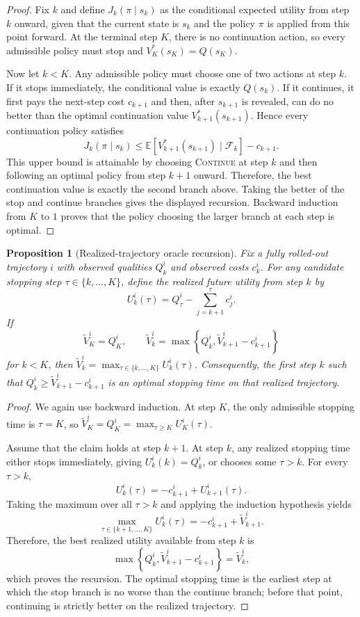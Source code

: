 \documentclass{article}
\newtheorem{proposition}{Proposition}[section]
\begin{document}
\begin{proof}
Fix $k$ and define $J_k(\pi\mid s_k)$ as the conditional expected utility from step $k$ onward, given that the current state is $s_k$ and the policy $\pi$ is applied from this point forward. At the terminal step $K$, there is no continuation action, so every admissible policy must stop and $V_K^*(s_K)=Q(s_K)$.

Now let $k<K$. Any admissible policy must choose one of two actions at step $k$. If it stops immediately, the conditional value is exactly $Q(s_k)$. If it continues, it first pays the next-step cost $c_{k+1}$ and then, after $s_{k+1}$ is revealed, can do no better than the optimal continuation value $V_{k+1}^*(s_{k+1})$. Hence every continuation policy satisfies
\[
  J_k(\pi\mid s_k)
  \le
  \mathbb{E}\left[V_{k+1}^*(s_{k+1})\mid\mathcal{F}_k\right]-c_{k+1}.
\]
This upper bound is attainable by choosing \textsc{Continue} at step $k$ and then following an optimal policy from step $k+1$ onward. Therefore, the best continuation value is exactly the second branch above. Taking the better of the stop and continue branches gives the displayed recursion. Backward induction from $K$ to $1$ proves that the policy choosing the larger branch at each step is optimal.
\end{proof}

\begin{proposition}[Realized-trajectory oracle recursion]
\label{prop:trajectory-dp-appendix}
Fix a fully rolled-out trajectory $i$ with observed qualities $Q_k^i$ and observed costs $c_k^i$. For any candidate stopping step $\tau\in\{k,\ldots,K\}$, define the realized future utility from step $k$ by
\[
  U_k^i(\tau)=Q_\tau^i-\sum_{j=k+1}^{\tau} c_j^i .
\]
If
\[
  \widetilde V_K^i=Q_K^i,\qquad
  \widetilde V_k^i=\max\left\{Q_k^i,\widetilde V_{k+1}^i-c_{k+1}^i\right\}
\]
for $k<K$, then $\widetilde V_k^i=\max_{\tau\in\{k,\ldots,K\}}U_k^i(\tau)$. Consequently, the first step $k$ such that $Q_k^i\ge \widetilde V_{k+1}^i-c_{k+1}^i$ is an optimal stopping time on that realized trajectory.
\end{proposition}

\begin{proof}
We again use backward induction. At step $K$, the only admissible stopping time is $\tau=K$, so $\widetilde V_K^i=Q_K^i=\max_{\tau\ge K}U_K^i(\tau)$.

Assume that the claim holds at step $k+1$. At step $k$, any realized stopping time either stops immediately, giving $U_k^i(k)=Q_k^i$, or chooses some $\tau>k$. For every $\tau>k$,
\[
  U_k^i(\tau)
  =
  -c_{k+1}^i + U_{k+1}^i(\tau).
\]
Taking the maximum over all $\tau>k$ and applying the induction hypothesis yields
\[
  \max_{\tau\in\{k+1,\ldots,K\}}U_k^i(\tau)
  =
  -c_{k+1}^i + \widetilde V_{k+1}^i.
\]
Therefore, the best realized utility available from step $k$ is
\[
  \max\left\{Q_k^i,\widetilde V_{k+1}^i-c_{k+1}^i\right\}
  =
  \widetilde V_k^i,
\]
which proves the recursion. The optimal stopping time is the earliest step at which the stop branch is no worse than the continue branch; before that point, continuing is strictly better on the realized trajectory.
\end{proof}
\end{document}
